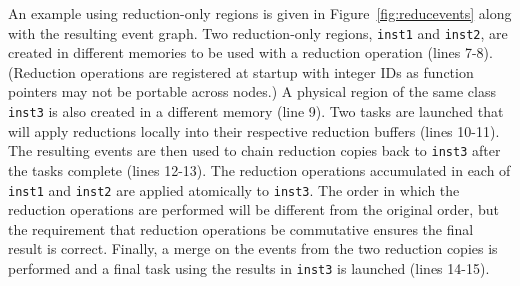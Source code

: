 

An example using reduction-only regions is given in Figure~\ref{fig:reducevents} along with the resulting event graph.
Two reduction-only regions, {\tt inst1} and {\tt inst2}, are created in different memories to
be used with a reduction operation (lines 7-8).  (Reduction operations are registered at startup with integer IDs
as function pointers may not be portable across nodes.)  A physical region of the same class {\tt inst3}
is also created in a different memory (line 9).  Two tasks are launched that will apply
reductions locally into their respective reduction buffers (lines 10-11).  The resulting
events are then used to chain reduction copies back to {\tt inst3} after the tasks complete (lines 12-13).
The reduction operations accumulated in each of {\tt inst1} and {\tt inst2} are applied atomically
to {\tt inst3}.  The order in which the reduction operations are performed will be different from
the original order, but the requirement that reduction operations be commutative ensures the final
result is correct.  Finally, a merge on the events from the two reduction copies is 
performed and a final task using the results in {\tt inst3} is launched (lines 14-15).


